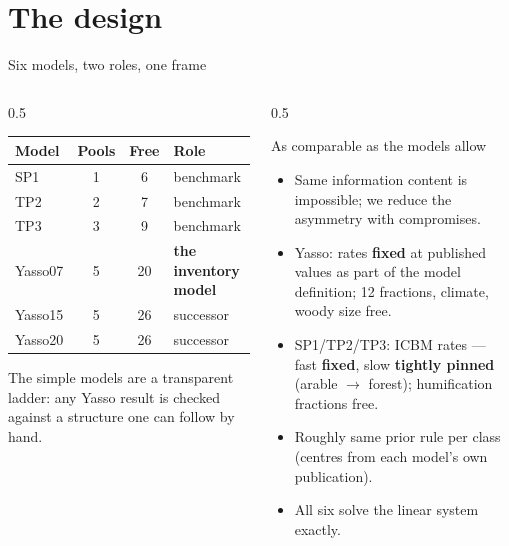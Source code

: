 \documentclass[aspectratio=169,11pt]{beamer}
\begin{document}
\section{The design}

\begin{frame}{Six models, two roles, one frame}
  \footnotesize
  \begin{columns}[T]
    \begin{column}{0.5\textwidth}
      \small
      \scriptsize
      \begin{tabular}{lccl}
        \toprule
        Model & Pools & Free & Role \\
        \midrule
        SP1 & 1 & 6 & benchmark \\
        TP2 & 2 & 7 & benchmark \\
        TP3 & 3 & 9 & benchmark \\
        Yasso07 & 5 & 20 & \textbf{the inventory model} \\
        Yasso15 & 5 & 26 & successor \\
        Yasso20 & 5 & 26 & successor \\
        \bottomrule
      \end{tabular}
      \vspace{0.4em}

      \footnotesize The simple models are a transparent ladder: any Yasso result is checked against a structure one can follow by hand.
    \end{column}
    \begin{column}{0.5\textwidth}
      \begin{block}{As comparable as the models allow}
        \begin{itemize}
          \item Same information content is impossible; we reduce the asymmetry with compromises.
          \item Yasso: rates \textbf{fixed} at published values as part of the model definition; 12 fractions, climate, woody size free.
          \item SP1/TP2/TP3: ICBM rates --- fast \textbf{fixed}, slow \textbf{tightly pinned} (arable $\to$ forest); humification fractions free.
          \item Roughly same prior rule per class (centres from each model's own publication).
          \item All six solve the linear system exactly.
        \end{itemize}
      \end{block}
    \end{column}
  \end{columns}
\end{frame}
\end{document}
